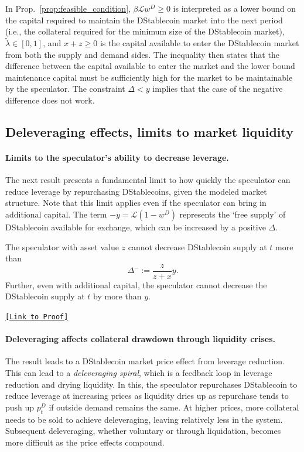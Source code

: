 In Prop.~\ref{prop:feasible_condition}, $\beta\mathcal{L}w^D \geq 0$ is interpreted as a lower bound on the capital required to maintain the DStablecoin market into the next period (i.e., the collateral required for the minimum size of the DStablecoin market), $\tilde\lambda \in [0,1]$, and $x+z \geq 0$ is the capital available to enter the DStablecoin market from both the supply and demand sides. The inequality then states that the difference between the capital available to enter the market and the lower bound maintenance capital must be sufficiently high for the market to be maintainable by the speculator. The constraint $\Delta < y$ implies that the case of the negative difference does not work.





\subsection{Deleveraging effects, limits to market liquidity}\label{sec:deleveraging}

\paragraph{Limits to the speculator's ability to decrease leverage.}
The next result presents a fundamental limit to how quickly the speculator can reduce leverage by repurchasing DStablecoins, given the modeled market structure. Note that this limit applies even if the speculator can bring in additional capital. The term $-y = \mathcal{L}(1-w^D)$ represents the `free supply' of DStablecoin available for exchange, which can be increased by a positive $\Delta$.

\begin{proposition}\label{prop:liquidity_limit}
	The speculator with asset value $z$ cannot decrease DStablecoin supply at $t$ more than
	$$\Delta^- := \frac{z}{z+x}y.$$
	Further, even with additional capital, the speculator cannot decrease the DStablecoin supply at $t$ by more than $y$.
\end{proposition}

\begin{center} \hyperlink{pf:liquidity_limit}{\texttt{[Link to Proof]}} \end{center}


\paragraph{Deleveraging affects collateral drawdown through liquidity crises.}
The result leads to a DStablecoin market price effect from leverage reduction. This can lead to a \emph{deleveraging spiral}, which is a feedback loop in leverage reduction and drying liquidity. In this, the speculator repurchases DStablecoin to reduce leverage at increasing prices as liquidity dries up as repurchase tends to push up $p_t^D$ if outside demand remains the same. At higher prices, more collateral needs to be sold to achieve deleveraging, leaving relatively less in the system. Subsequent deleveraging, whether voluntary or through liquidation, becomes more difficult as the price effects compound.

